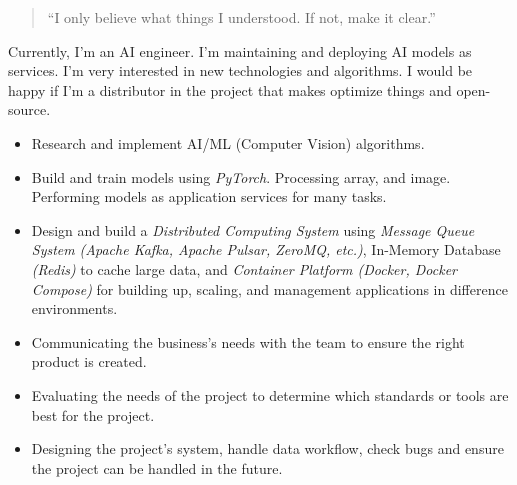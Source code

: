 \documentclass[10pt,a4paper,ragged2e,withhyper]{altacv}
\begin{document}
\begin{paracol}{2}
\bigskip

\begin{quote}
	``I only believe what things I understood. If not, make it clear.''
\end{quote}

\bigskip

\begin{minipage}{\linewidth}
\justifying
Currently, I'm an AI engineer. I'm maintaining and deploying AI models as services. I'm very interested in new technologies and algorithms. I would be happy if I'm a distributor in the project that makes optimize things and open-source.
\end{minipage}

\smallskip



\begin{minipage}{\linewidth}
\justifying
\begin{itemize}
	
	\item Research and implement AI/ML (Computer Vision) algorithms.
	\item Build and train models using \textit{PyTorch}. Processing array, and image. Performing models as application services for many tasks.
	
	\item Design and build a \textit{Distributed Computing System} using \textit{Message Queue System} \textit{(Apache Kafka, Apache Pulsar, ZeroMQ, etc.)}, In-Memory Database \textit{(Redis)} to cache large data, and \textit{Container Platform (Docker, Docker Compose)} for building up, scaling, and management applications in difference environments.
	
	\item Communicating the business's needs with the team to ensure the right product is created. 
	\item Evaluating the needs of the project to determine which standards or tools are best for the project. 
	\item Designing the project’s system, handle data workflow, check bugs and ensure the project can be handled in the future.
	

\end{itemize}
\end{minipage}
\end{paracol}
\end{document}
